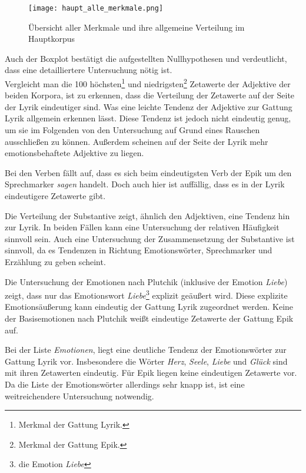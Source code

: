 \documentclass[a4paper,10p]{article}
\begin{document}
\begin{wrapfigure}{l}{0.5\textwidth}
	\texttt{[image: haupt\_alle\_merkmale.png]}
	\caption{Übersicht aller Merkmale und ihre allgemeine Verteilung im Hauptkorpus}
	\label{fig:haupt_alle_merkmale}
\end{wrapfigure}


Auch der Boxplot bestätigt die aufgestellten Nullhypothesen und verdeutlicht, dass eine detailliertere Untersuchung nötig ist.\\


Vergleicht man die 100 höchsten\footnote{Merkmal der Gattung Lyrik.} und niedrigsten\footnote{Merkmal der Gattung Epik.} Zetawerte der Adjektive der beiden Korpora, ist zu erkennen, dass die Verteilung der Zetawerte auf der Seite der Lyrik eindeutiger sind. Was eine leichte Tendenz der Adjektive zur Gattung Lyrik allgemein erkennen lässt. Diese Tendenz ist jedoch nicht eindeutig genug, um sie im Folgenden von den Untersuchung auf Grund eines Rauschen ausschließen zu können. Außerdem scheinen auf der Seite der Lyrik mehr emotionsbehaftete Adjektive zu liegen. \par 

Bei den Verben fällt auf, dass es sich beim eindeutigsten Verb der Epik um den Sprechmarker \textit{sagen} handelt. Doch auch hier ist auffällig, dass es in der Lyrik eindeutigere Zetawerte gibt.  \par 

Die Verteilung der Substantive zeigt, ähnlich den Adjektiven, eine Tendenz hin zur Lyrik. In beiden Fällen kann eine Untersuchung der relativen Häufigkeit sinnvoll sein. Auch eine Untersuchung der Zusammensetzung der Substantive ist sinnvoll, da es Tendenzen in Richtung Emotionswörter, Sprechmarker und Erzählung zu geben scheint.\par 

Die Untersuchung der Emotionen nach Plutchik (inklusive der Emotion \textit{Liebe}) zeigt, dass nur das Emotionswort \textit{Liebe}\footnote{die Emotion \textit{Liebe}} explizit geäußert wird. Diese explizite Emotionsäußerung kann eindeutig der Gattung Lyrik zugeordnet werden. Keine der Basisemotionen nach Plutchik weißt eindeutige Zetawerte der Gattung Epik auf. \par 

Bei der Liste \textit{Emotionen}, liegt eine deutliche Tendenz der Emotionswörter zur Gattung Lyrik vor. Insbesondere die Wörter \textit{Herz}, \textit{Seele},  \textit{Liebe} und \textit{Glück} sind mit ihren Zetawerten eindeutig. Für Epik liegen keine eindeutigen Zetawerte vor. Da die Liste der Emotionswörter allerdings sehr knapp ist, ist eine weitreichendere Untersuchung notwendig.  \par 
\end{document}

